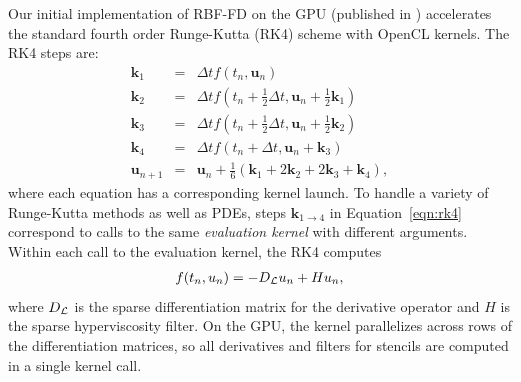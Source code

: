 \documentclass{report}
\begin{document}
Our initial implementation of RBF-FD on the GPU (published in \cite{BolligFlyerErlebacher2012}) accelerates the standard fourth order Runge-Kutta (RK4) scheme with OpenCL kernels. 
The RK4 steps are: 
\begin{eqnarray} 
\mathbf{k}_1 &=& \Delta t f(t_n, \mathbf{u}_n) \nonumber \\
\mathbf{k}_2 &=& \Delta t f(t_n+\frac{1}{2}\Delta t, \mathbf{u}_n + \frac{1}{2}\mathbf{k}_1) \nonumber \\
\mathbf{k}_3 &=& \Delta t f(t_n+\frac{1}{2}\Delta t, \mathbf{u}_n + \frac{1}{2}\mathbf{k}_2)  \label{eqn:rk4}\\
\mathbf{k}_4 &=& \Delta t f(t_n+\Delta t, \mathbf{u}_n + \mathbf{k}_3) \nonumber \\
\mathbf{u}_{n+1} &=& \mathbf{u}_{n} + \frac{1}{6}(\mathbf{k}_1 + 2\mathbf{k}_2 + 2\mathbf{k}_3 +\mathbf{k}_4), \nonumber
\end{eqnarray}
where each equation has a corresponding kernel launch. 
To handle a variety of Runge-Kutta methods as well as PDEs, steps $\mathbf{k}_{1\rightarrow4}$ in Equation~\ref{eqn:rk4} correspond to calls to the same \emph{evaluation kernel} with different arguments. Within each call to the evaluation kernel, the RK4 computes
\begin{align*}
f(t_n, u_n) = - D_{\mathcal{L}} u_n + H u_n, 
\end{align*}
where $D_{\mathcal{L}}$ is the sparse differentiation matrix for the derivative operator and $H$ is the sparse hyperviscosity filter. On the GPU, the kernel parallelizes across rows of the differentiation matrices, so all derivatives and filters for stencils are computed in a single kernel call.

\end{document}
